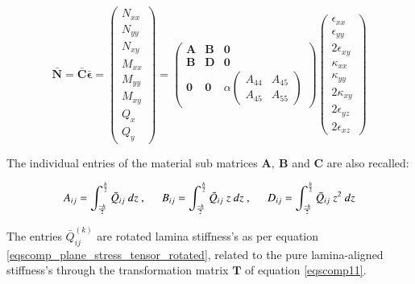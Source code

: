 \begin{equation} 
\bar{\mathbf{N}} = \bar{\mathbf{C}} \bar{\boldsymbol{\epsilon}} =
\begin{pmatrix}
N_{xx} \\
N_{yy} \\
N_{xy} \\
M_{xx} \\
M_{yy} \\
M_{xy} \\
Q_{x} \\
Q_{y} 
\end{pmatrix} 
=
\begin{pmatrix}
\mathbf{A} & \mathbf{B} & \mathbf{0} \\
\mathbf{B} & \mathbf{D} & \mathbf{0} \\
\mathbf{0}& \mathbf{0} & \alpha		\begin{pmatrix}
{A}_{44} & {A}_{45} \\
{A}_{45} & {A}_{55} 
\end{pmatrix} 
\end{pmatrix} 
\begin{pmatrix}
\epsilon_{xx} \\
\epsilon_{yy} \\
2\epsilon_{xy}\\
\kappa_{xx}\\
\kappa_{yy}\\
2\kappa_{xy} \\
2\epsilon_{yz} \\
2\epsilon_{xz}
\end{pmatrix}
\label{eqscomp_laminate_form1}
\end{equation}

The individual entries of the material sub matrices $\mathbf{A},\ \mathbf{B}$ and $\mathbf{C}$ are also recalled:

\begin{equation} 
A_{ij} = 
\int_{\frac{-h}{2}}^{\frac{h}{2}}
\bar{Q}_{ij}
\ dz\ ,
\hspace{5mm}
B_{ij} = 
\int_{\frac{-h}{2}}^{\frac{h}{2}}
\bar{Q}_{ij}\ z
\ dz\ ,
\hspace{5mm}
D_{ij} = 
\int_{\frac{-h}{2}}^{\frac{h}{2}}
\bar{Q}_{ij}\ z^2
\ dz
\label{eqscomp_laminate_form2}
\end{equation}


The entries $\bar{Q}_{ij}^{(k)}$ are rotated lamina stiffness's as per equation \ref{eqscomp_plane_stress_tensor_rotated}, related to the pure lamina-aligned stiffness's through the transformation matrix $\mathbf{T}$ of equation \ref{eqscomp11}.

